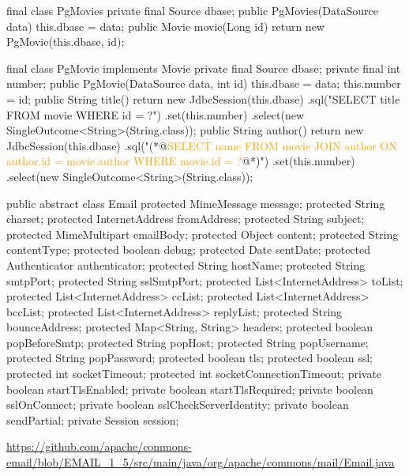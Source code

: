 \documentclass{article}
\begin{document}
\begin{lnSnippet}
final class PgMovies
  private final Source dbase;
  public PgMovies(DataSource data)
    this.dbase = data;
  public Movie movie(Long id)
    return new PgMovie(this.dbase, id);
\end{lnSnippet}
\begin{lnSnippet}
final class PgMovie implements Movie
  private final Source dbase;
  private final int number;
  public PgMovie(DataSource data, int id)
    this.dbase = data;
    this.number = id;
  public String title()
    return new JdbcSession(this.dbase)
      .sql("SELECT title FROM movie WHERE id = ?")
      .set(this.number)
      .select(new SingleOutcome<String>(String.class));
  public String author()
    return new JdbcSession(this.dbase)
      .sql("(*@\textcolor{orange}{SELECT name FROM movie JOIN author ON author.id = movie.author WHERE movie.id = ?}@*)")
      .set(this.number)
      .select(new SingleOutcome<String>(String.class));
\end{lnSnippet}


\begin{pptWide}{2}
{\scriptsize\begin{ffcode}
public abstract class Email {
  protected MimeMessage message;
  protected String charset;
  protected InternetAddress fromAddress;
  protected String subject;
  protected MimeMultipart emailBody;
  protected Object content;
  protected String contentType;
  protected boolean debug;
  protected Date sentDate;
  protected Authenticator authenticator;
  protected String hostName;
  protected String smtpPort;
  protected String sslSmtpPort;
  protected List<InternetAddress> toList;
  protected List<InternetAddress> ccList;
  protected List<InternetAddress> bccList;
  protected List<InternetAddress> replyList;
  protected String bounceAddress;
  protected Map<String, String> headers;
  protected boolean popBeforeSmtp;
  protected String popHost;
  protected String popUsername;
  protected String popPassword;
  protected boolean tls;
  protected boolean ssl;
  protected int socketTimeout;
  protected int socketConnectionTimeout;
  private boolean startTlsEnabled;
  private boolean startTlsRequired;
  private boolean sslOnConnect;
  private boolean sslCheckServerIdentity;
  private boolean sendPartial;
  private Session session;
}
\end{ffcode}
}
\end{pptWide}
\par
{\tiny\url{https://github.com/apache/commons-email/blob/EMAIL_1_5/src/main/java/org/apache/commons/mail/Email.java}\par}
\plush{}
\end{document}
